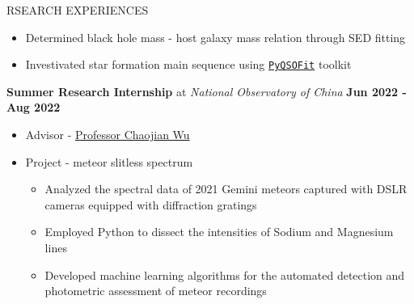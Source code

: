 \documentclass[10pt]{article} %
\begin{document}
\begin{section}{RSEARCH EXPERIENCES}
\begin{itemize}[leftmargin=1.5em]
\begin{itemize}[leftmargin=1.5em]
        \item Determined black hole mass - host galaxy mass relation through SED fitting
        \item Investivated star formation main sequence using \href{https://github.com/legolason/PyQSOFit}{\texttt{PyQSOFit}} toolkit
    \end{itemize}
\end{itemize}

\textbf{Summer Research Internship} at \textit{National Observatory of China} \hfill \textbf{Jun 2022 - Aug 2022} 
\begin{itemize}[leftmargin=1.5em]
    \item Advisor - \href{mailto:chjwu@bao.ac.cn}{Professor Chaojian Wu}
    \item Project - meteor slitless spectrum
    \begin{itemize}[leftmargin=1.5em]
        \item Analyzed the spectral data of 2021 Gemini meteors captured with DSLR cameras equipped with diffraction gratings
        \item Employed Python to dissect the intensities of Sodium and Magnesium lines 
        \item Developed machine learning algorithms for the automated detection and photometric assessment of meteor recordings
    \end{itemize}
\end{itemize}


\end{section}
\end{document}
